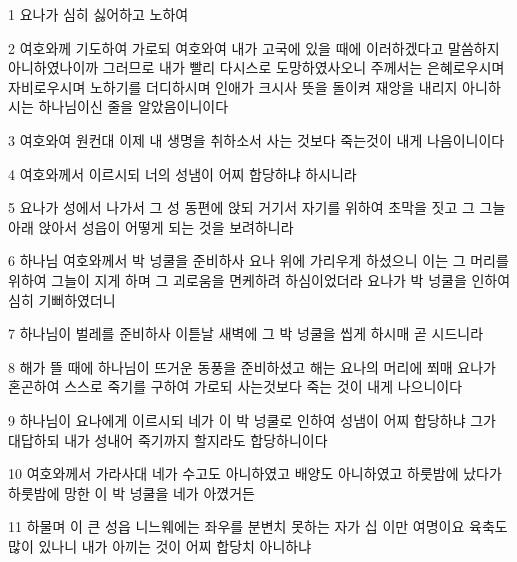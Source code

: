 \par 1 요나가 심히 싫어하고 노하여
\par 2 여호와께 기도하여 가로되 여호와여 내가 고국에 있을 때에 이러하겠다고 말씀하지 아니하였나이까 그러므로 내가 빨리 다시스로 도망하였사오니 주께서는 은혜로우시며 자비로우시며 노하기를 더디하시며 인애가 크시사 뜻을 돌이켜 재앙을 내리지 아니하시는 하나님이신 줄을 알았음이니이다
\par 3 여호와여 원컨대 이제 내 생명을 취하소서 사는 것보다 죽는것이 내게 나음이니이다
\par 4 여호와께서 이르시되 너의 성냄이 어찌 합당하냐 하시니라
\par 5 요나가 성에서 나가서 그 성 동편에 앉되 거기서 자기를 위하여 초막을 짓고 그 그늘 아래 앉아서 성읍이 어떻게 되는 것을 보려하니라
\par 6 하나님 여호와께서 박 넝쿨을 준비하사 요나 위에 가리우게 하셨으니 이는 그 머리를 위하여 그늘이 지게 하며 그 괴로움을 면케하려 하심이었더라 요나가 박 넝쿨을 인하여 심히 기뻐하였더니
\par 7 하나님이 벌레를 준비하사 이튿날 새벽에 그 박 넝쿨을 씹게 하시매 곧 시드니라
\par 8 해가 뜰 때에 하나님이 뜨거운 동풍을 준비하셨고 해는 요나의 머리에 쬐매 요나가 혼곤하여 스스로 죽기를 구하여 가로되 사는것보다 죽는 것이 내게 나으니이다
\par 9 하나님이 요나에게 이르시되 네가 이 박 넝쿨로 인하여 성냄이 어찌 합당하냐 그가 대답하되 내가 성내어 죽기까지 할지라도 합당하니이다
\par 10 여호와께서 가라사대 네가 수고도 아니하였고 배양도 아니하였고 하룻밤에 났다가 하룻밤에 망한 이 박 넝쿨을 네가 아꼈거든
\par 11 하물며 이 큰 성읍 니느웨에는 좌우를 분변치 못하는 자가 십 이만 여명이요 육축도 많이 있나니 내가 아끼는 것이 어찌 합당치 아니하냐



